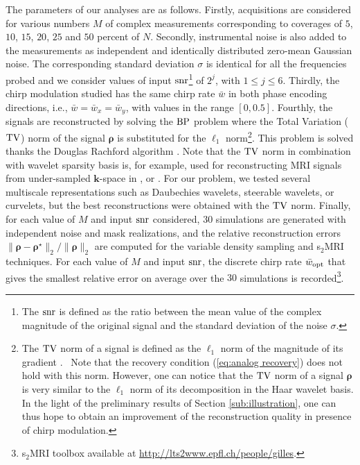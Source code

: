 \documentclass[10pt,draftcls, onecolumn]{IEEEtran}
\begin{document}
The parameters of our analyses are as follows. Firstly, acquisitions are considered for various numbers $M$ of complex measurements corresponding to coverages of $5$, $10$, $15$, $20$, $25$ and $50$ percent of $N$. Secondly, instrumental noise is also added to the measurements as independent and identically distributed zero-mean Gaussian noise. The corresponding standard deviation $\sigma$ is identical for all the frequencies probed and we consider values of input ${\rm snr}$\footnote{The ${\rm snr}$ is defined as the ratio between the mean value of the complex magnitude of the original signal and the standard deviation of the noise $\sigma$.} of $2^j$, with $1\leq j \leq 6$. Thirdly, the chirp modulation studied has the same chirp rate $\bar{w}$ in both phase encoding directions, i.e., $\bar{w}=\bar{w}_x=\bar{w}_y$, with values in the range $[0, 0.5]$. Fourthly, the signals are reconstructed by solving the ${\rm BP}$ problem where the Total Variation (${\rm TV}$) norm of the signal $\bm \rho$ is substituted for the $\ell_1$ norm\footnote{The ${\rm TV}$ norm of a signal is defined as the $\ell_{1}$ norm of the magnitude of its gradient \cite{candes06a, rudin92}. \ Note that the recovery condition (\ref{eq:analog recovery}) does not hold with this norm. However, one can notice that the ${\rm TV}$ norm of a signal $\bm{\rho}$ is very similar to the $\ell_1$ norm of its decomposition in the Haar wavelet basis. In the light of the preliminary results of Section \ref{sub:illustration}, one can thus hope to obtain an improvement of the reconstruction quality in presence of chirp modulation.}. This problem is solved thanks the Douglas Rachford algorithm \cite{combettes11, fadili09}. Note that the ${\rm TV}$ norm in combination with wavelet sparsity basis is, for example, used for reconstructing MRI signals from under-sampled $\bm{k}$-space in \cite{lustig07, liang09a}, or \cite{kern11}. For our problem, we tested several multiscale representations such as Daubechies wavelets, steerable wavelets, or curvelets, but the best reconstructions were obtained with the ${\rm TV}$ norm. Finally, for each value of $M$ and input ${\rm snr}$ considered, $30$ simulations are generated with independent noise and mask realizations, and the relative reconstruction errors $\|\bm{\rho}-\bm{\rho}^\star\|_2/\|\bm{\rho}\|_2$ are computed for the variable density sampling and s$_2$MRI techniques. For each value of $M$ and input ${\rm snr}$, the discrete chirp rate $\bar{w}_{\rm opt}$ that gives the smallest relative error on average over the $30$ simulations is recorded\footnote{s$_2$MRI toolbox available at \url{http://lts2www.epfl.ch/people/gilles}.}.
\end{document}
